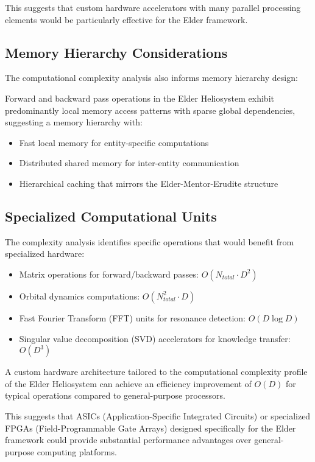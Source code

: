 This suggests that custom hardware accelerators with many parallel processing elements would be particularly effective for the Elder framework.

\subsection{Memory Hierarchy Considerations}

The computational complexity analysis also informs memory hierarchy design:

\begin{theorem}
Forward and backward pass operations in the Elder Heliosystem exhibit predominantly local memory access patterns with sparse global dependencies, suggesting a memory hierarchy with:
\begin{itemize}
    \item Fast local memory for entity-specific computations
    \item Distributed shared memory for inter-entity communication
    \item Hierarchical caching that mirrors the Elder-Mentor-Erudite structure
\end{itemize}
\end{theorem}

\subsection{Specialized Computational Units}

The complexity analysis identifies specific operations that would benefit from specialized hardware:

\begin{itemize}
    \item Matrix operations for forward/backward passes: $O(N_{total} \cdot D^2)$
    \item Orbital dynamics computations: $O(N_{total}^2 \cdot D)$
    \item Fast Fourier Transform (FFT) units for resonance detection: $O(D \log D)$
    \item Singular value decomposition (SVD) accelerators for knowledge transfer: $O(D^3)$
\end{itemize}



\begin{theorem}
A custom hardware architecture tailored to the computational complexity profile of the Elder Heliosystem can achieve an efficiency improvement of $O(D)$ for typical operations compared to general-purpose processors.
\end{theorem}

This suggests that ASICs (Application-Specific Integrated Circuits) or specialized FPGAs (Field-Programmable Gate Arrays) designed specifically for the Elder framework could provide substantial performance advantages over general-purpose computing platforms.
